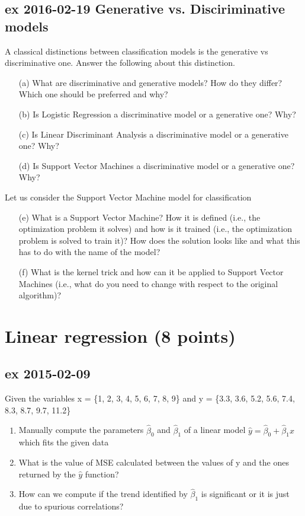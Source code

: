 \documentclass[a4paper,12pt,titlepage]{article} %
\begin{document}
\subsection{ex 2016-02-19 Generative vs. Disciriminative models}
A classical distinctions between classification models is the generative vs discriminative one. Answer the following about this distinction.

\begin{itemize}
\item[(a)] What are discriminative and generative models? How do they differ? Which one should be preferred and why?
\item[(b)] Is Logistic Regression a discriminative model or a generative one? Why?
\item[(c)] Is Linear Discriminant Analysis a discriminative model or a generative one? Why?
\item[(d)] Is Support Vector Machines a discriminative model or a generative one? Why?
\end{itemize}

Let us consider the Support Vector Machine model for classification

\begin{itemize}
\item[(e)] What is a Support Vector Machine? How it is defined (i.e., the optimization problem it solves) and how is it trained (i.e., the optimization problem is solved to train it)? How does the solution looks like and what this has to do with the name of the model?
\item[(f)] What is the kernel trick and how can it be applied to Support Vector Machines (i.e., what do you need to change with respect to the original algorithm)?
\end{itemize}

\newpage
\section{Linear regression (8 points)}
\subsection{ex 2015-02-09}
Given the variables x = \{1, 2, 3, 4, 5, 6, 7, 8, 9\} and y = \{3.3, 3.6, 5.2, 5.6, 7.4, 8.3, 8.7, 9.7, 11.2\}
\begin{enumerate}
\item Manually compute the parameters $\hat{\beta}_{0} $ and $\hat{\beta}_{1} $ of a linear model $ \hat{y} = \hat{\beta}_{0} + \hat{\beta}_{1} x$ which fits the given data
\item What is the value of MSE calculated between the values of y and the ones returned by the $\hat{y}$ function?
\item How can we compute if the trend identified by $\hat{\beta}_{1}$ is significant or it is just due to spurious correlations?
\end{enumerate}
 
\end{document}
